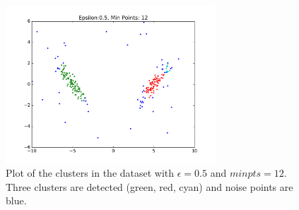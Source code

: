 \documentclass[12pt]{article}
\begin{document}
\begin{figure}[htp]
\centering
            \includegraphics[width=0.7\textwidth]{images/test_results_1.pdf}   
    \caption{Plot of the clusters in the dataset with $\epsilon=0.5$ and $minpts=12$. Three clusters are detected (green, red, cyan) and noise points are blue.}
   \label{fig:Variant1}
\end{figure}



\end{document}
